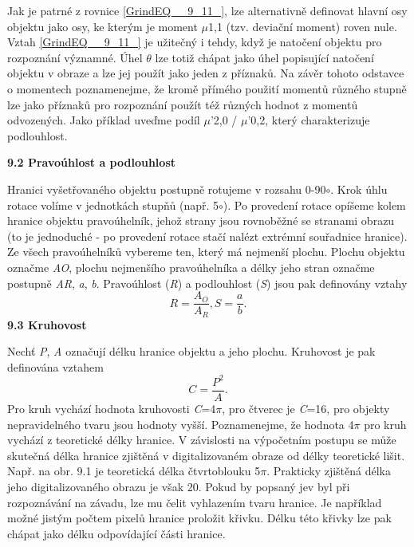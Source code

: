 \noindent Jak je patrné z rovnice \eqref{GrindEQ__9_11_}, lze alternativně definovat hlavní osy objektu jako osy, ke kterým je moment $\mu$1,1 (tzv. deviační moment) roven nule. Vztah \eqref{GrindEQ__9_11_} je užitečný i tehdy, když je natočení objektu pro rozpoznání významné. Úhel $\theta$ lze totiž chápat jako úhel popisující natočení objektu v obraze a lze jej použít jako jeden z příznaků. Na závěr tohoto odstavce o momentech poznamenejme, že kromě přímého použití momentů různého stupně lze jako příznaků pro rozpoznání použít též různých hodnot z momentů odvozených. Jako příklad uveďme podíl $\mu$'2,0 / $\mu$'0,2, který charakterizuje podlouhlost. 

\noindent \textbf{9.2  Pravoúhlost a podlouhlost}

\noindent Hranici vyšetřovaného objektu postupně rotujeme v rozsahu 0-90$\circ$. Krok úhlu rotace volíme v jednotkách stupňů (např. 5$\circ$). Po provedení rotace opíšeme kolem hranice objektu pravoúhelník, jehož strany jsou rovnoběžné se stranami obrazu (to je jednoduché - po provedení rotace stačí nalézt extrémní souřadnice hranice). Ze všech pravoúhelníků vybereme ten, který má nejmenší plochu. Plochu objektu označme \textit{AO}, plochu nejmenšího pravoúhelníka a délky jeho stran označme postupně \textit{AR}, \textit{a}, \textit{b}. Pravoúhlost (\textit{R}) a podlouhlost (\textit{S}) jsou pak definovány vztahy  
\begin{equation} \label{GrindEQ__9_13_} 
R=\frac{A_{O} }{A_{R} } ,     S=\frac{a}{b} .  
\end{equation} 
\textbf{9.3  Kruhovost}

\noindent Nechť \textit{P}, \textit{A} označují délku hranice objektu a jeho plochu. Kruhovost je pak definována vztahem
\begin{equation} \label{GrindEQ__9_14_} 
C=\frac{P^{2} }{A} .  
\end{equation} 
Pro kruh vychází hodnota kruhovosti \textit{C}=4$\pi$, pro čtverec je \textit{C}=16, pro objekty nepravidelného tvaru jsou hodnoty vyšší. Poznamenejme, že hodnota 4$\pi$ pro kruh vychází z teoretické délky hranice. V závislosti na výpočetním postupu se může skutečná délka hranice zjištěná v digitalizovaném obraze od délky teoretické lišit. Např. na obr. 9.1 je teoretická délka čtvrtoblouku 5$\pi$. Prakticky zjištěná délka jeho digitalizovaného obrazu je však 20. Pokud by popsaný jev byl při rozpoznávání na závadu, lze mu čelit vyhlazením tvaru hranice. Je například možné jistým počtem pixelů hranice proložit křivku. Délku této křivky lze pak chápat jako délku odpovídající části hranice.

